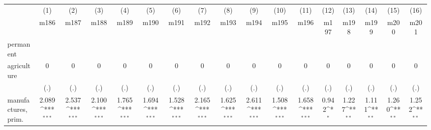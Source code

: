 {
\def\sym#1{\ifmmode^{#1}\else\(^{#1}\)\fi}
\begin{tabular}{l*{16}{c}}
\hline\hline
                    &\multicolumn{1}{c}{(1)}&\multicolumn{1}{c}{(2)}&\multicolumn{1}{c}{(3)}&\multicolumn{1}{c}{(4)}&\multicolumn{1}{c}{(5)}&\multicolumn{1}{c}{(6)}&\multicolumn{1}{c}{(7)}&\multicolumn{1}{c}{(8)}&\multicolumn{1}{c}{(9)}&\multicolumn{1}{c}{(10)}&\multicolumn{1}{c}{(11)}&\multicolumn{1}{c}{(12)}&\multicolumn{1}{c}{(13)}&\multicolumn{1}{c}{(14)}&\multicolumn{1}{c}{(15)}&\multicolumn{1}{c}{(16)}\\
                    &\multicolumn{1}{c}{m186}&\multicolumn{1}{c}{m187}&\multicolumn{1}{c}{m188}&\multicolumn{1}{c}{m189}&\multicolumn{1}{c}{m190}&\multicolumn{1}{c}{m191}&\multicolumn{1}{c}{m192}&\multicolumn{1}{c}{m193}&\multicolumn{1}{c}{m194}&\multicolumn{1}{c}{m195}&\multicolumn{1}{c}{m196}&\multicolumn{1}{c}{m197}&\multicolumn{1}{c}{m198}&\multicolumn{1}{c}{m199}&\multicolumn{1}{c}{m200}&\multicolumn{1}{c}{m201}\\
\hline
permanent           &                     &                     &                     &                     &                     &                     &                     &                     &                     &                     &                     &                     &                     &                     &                     &                     \\
agriculture         &           0         &           0         &           0         &           0         &           0         &           0         &           0         &           0         &           0         &           0         &           0         &           0         &           0         &           0         &           0         &           0         \\
                    &         (.)         &         (.)         &         (.)         &         (.)         &         (.)         &         (.)         &         (.)         &         (.)         &         (.)         &         (.)         &         (.)         &         (.)         &         (.)         &         (.)         &         (.)         &         (.)         \\
[1em]
manufactures, prim. &       2.089\sym{***}&       2.537\sym{***}&       2.100\sym{***}&       1.765\sym{***}&       1.694\sym{***}&       1.528\sym{***}&       2.165\sym{***}&       1.625\sym{***}&       2.611\sym{***}&       1.508\sym{***}&       1.658\sym{***}&       0.942\sym{*}  &       1.227\sym{**} &       1.111\sym{**} &       1.260\sym{**} &       1.252\sym{**} \\

\end{tabular}}
